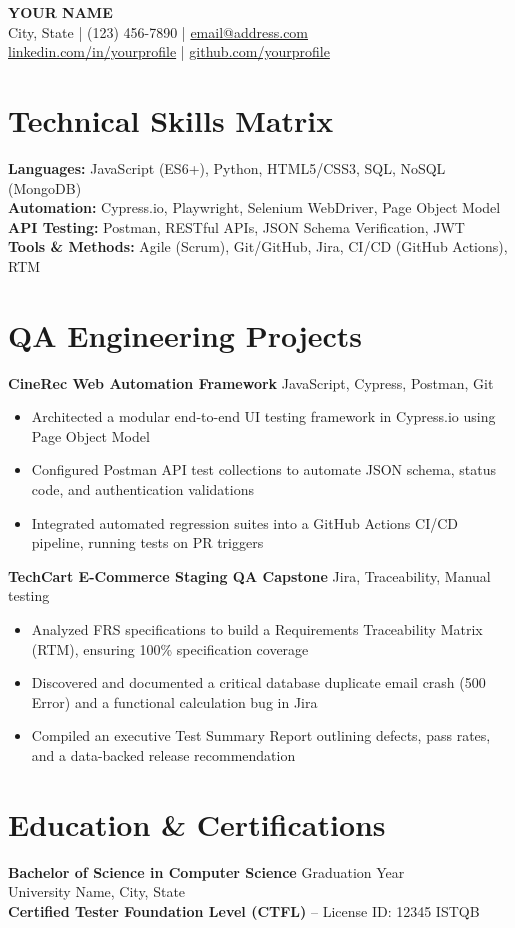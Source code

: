 \documentclass[10pt,letterpaper]{article}
\begin{document}
\pagestyle{empty}

\begin{center}
{\LARGE \textbf{YOUR NAME}} \\
City, State | (123) 456-7890 | \href{mailto:email@address.com}{email@address.com} \\
\href{https://linkedin.com/in/yourprofile}{linkedin.com/in/yourprofile} |
\href{https://github.com/yourprofile}{github.com/yourprofile}
\end{center}

\section{Technical Skills Matrix}
\textbf{Languages:} JavaScript (ES6+), Python, HTML5/CSS3, SQL, NoSQL (MongoDB) \\
\textbf{Automation:} Cypress.io, Playwright, Selenium WebDriver, Page Object Model \\
\textbf{API Testing:} Postman, RESTful APIs, JSON Schema Verification, JWT \\
\textbf{Tools \& Methods:} Agile (Scrum), Git/GitHub, Jira, CI/CD (GitHub Actions), RTM

\section{QA Engineering Projects}
\textbf{CineRec Web Automation Framework} \hfill JavaScript, Cypress, Postman, Git
\begin{itemize}
\item Architected a modular end-to-end UI testing framework in Cypress.io using Page Object Model
\item Configured Postman API test collections to automate JSON schema, status code, and
authentication validations
\item Integrated automated regression suites into a GitHub Actions CI/CD pipeline, running tests
on PR triggers
\end{itemize}

\vspace{0.2cm}
\textbf{TechCart E-Commerce Staging QA Capstone} \hfill Jira, Traceability, Manual testing
\begin{itemize}
\item Analyzed FRS specifications to build a Requirements Traceability Matrix (RTM), ensuring
100\% specification coverage
\item Discovered and documented a critical database duplicate email crash (500 Error) and a
functional calculation bug in Jira
\item Compiled an executive Test Summary Report outlining defects, pass rates, and a data-backed
release recommendation
\end{itemize}

\section{Education \& Certifications}
\textbf{Bachelor of Science in Computer Science} \hfill Graduation Year \\
University Name, City, State \\[0.2cm]
\textbf{Certified Tester Foundation Level (CTFL)} -- License ID: 12345 \hfill ISTQB
\end{document}
